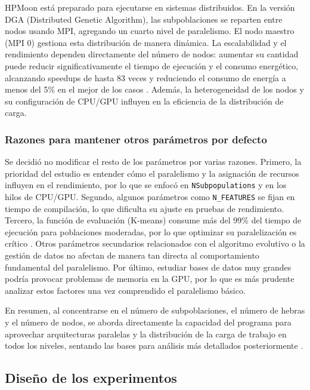 HPMoon está preparado para ejecutarse en sistemas distribuidos. En la versión DGA (Distributed Genetic Algorithm), las subpoblaciones se reparten entre nodos usando MPI, agregando un cuarto nivel de paralelismo. El nodo maestro (MPI 0) gestiona esta distribución de manera dinámica. La escalabilidad y el rendimiento dependen directamente del número de nodos: aumentar su cantidad puede reducir significativamente el tiempo de ejecución y el consumo energético, alcanzando speedups de hasta 83 veces y reduciendo el consumo de energía a menos del 5\% en el mejor de los casos \cite{escobar2020energy, Escobar2019}. Además, la heterogeneidad de los nodos y su configuración de CPU/GPU influyen en la eficiencia de la distribución de carga.

\subsubsection{Razones para mantener otros parámetros por defecto}

Se decidió no modificar el resto de los parámetros por varias razones. Primero, la prioridad del estudio es entender cómo el paralelismo y la asignación de recursos influyen en el rendimiento, por lo que se enfocó en \texttt{NSubpopulations} y en los hilos de CPU/GPU. Segundo, algunos parámetros como \texttt{N\_FEATURES} se fijan en tiempo de compilación, lo que dificulta su ajuste en pruebas de rendimiento. Tercero, la función de evaluación (K-means) consume más del 99\% del tiempo de ejecución para poblaciones moderadas, por lo que optimizar su paralelización es crítico \cite{escobar2020energy}. Otros parámetros secundarios relacionados con el algoritmo evolutivo o la gestión de datos no afectan de manera tan directa al comportamiento fundamental del paralelismo. Por último, estudiar bases de datos muy grandes podría provocar problemas de memoria en la GPU, por lo que es más prudente analizar estos factores una vez comprendido el paralelismo básico.

En resumen, al concentrarse en el número de subpoblaciones, el número de hebras y el número de nodos, se aborda directamente la capacidad del programa para aprovechar arquitecturas paralelas y la distribución de la carga de trabajo en todos los niveles, sentando las bases para análisis más detallados posteriormente \cite{escobar2020energy}.

\subsection{Diseño de los experimentos}\label{subsec:diseno_experimentos_detallado}

